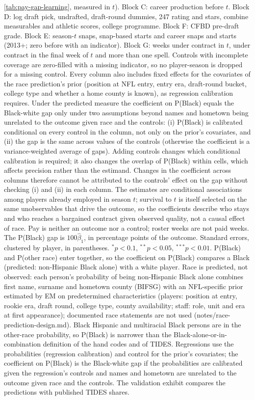 {\ref{tab:pay-gap-learning}, measured in $t$). Block C: career production before $t$. Block D: log draft pick, undrafted, draft-round dummies, 247 rating and stars, combine measurables and athletic scores, college programme. Block F: CFBD pre-draft grade. Block E: season-$t$ snaps, snap-based starts and career snaps and starts (2013+; zero before with an indicator). Block G: weeks under contract in $t$, under contract in the final week of $t$ and more than one spell. Controls with incomplete coverage are zero-filled with a missing indicator, so no player-season is dropped for a missing control. Every column also includes fixed effects for the covariates of the race prediction's prior (position at NFL entry, entry era, draft-round bucket, college type and whether a home county is known), as regression calibration requires. Under the predicted measure the coefficient on P(Black) equals the Black-white gap only under two assumptions beyond names and hometown being unrelated to the outcome given race and the controls: (i) P(Black) is calibrated conditional on every control in the column, not only on the prior's covariates, and (ii) the gap is the same across values of the controls (otherwise the coefficient is a variance-weighted average of gaps). Adding controls changes which conditional calibration is required; it also changes the overlap of P(Black) within cells, which affects precision rather than the estimand. Changes in the coefficient across columns therefore cannot be attributed to the controls' effect on the gap without checking (i) and (ii) in each column. The estimates are conditional associations among players already employed in season $t$; survival to $t$ is itself selected on the same unobservables that drive the outcome, so the coefficients describe who stays and who reaches a bargained contract given observed quality, not a causal effect of race. Pay is neither an outcome nor a control; roster weeks are not paid weeks. The P(Black) gap is $100\hat\beta_1$, in percentage points of the outcome. Standard errors, clustered by player, in parentheses. $^{*}p<0.1$, $^{**}p<0.05$, $^{***}p<0.01$. P(Black) and P(other race) enter together, so the coefficient on P(Black) compares a Black (predicted: non-Hispanic Black alone) with a white player. Race is predicted, not observed: each person's probability of being non-Hispanic Black alone combines first name, surname and hometown county (BIFSG) with an NFL-specific prior estimated by EM on predetermined characteristics (players: position at entry, rookie era, draft round, college type, county availability; staff: role, unit and era at first appearance); documented race statements are not used (notes/race-prediction-design.md). Black Hispanic and multiracial Black persons are in the other-race probability, so P(Black) is narrower than the Black-alone-or-in-combination definition of the hand codes and of TIDES. Regressions use the probabilities (regression calibration) and control for the prior's covariates; the coefficient on P(Black) is the Black-white gap if the probabilities are calibrated given the regression's controls and names and hometown are unrelated to the outcome given race and the controls. The validation exhibit compares the predictions with published TIDES shares.
\par}


